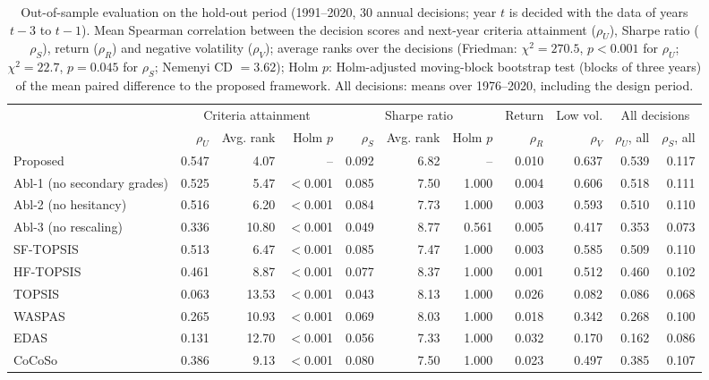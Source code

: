 \begin{table}[!htbp]
\centering
\scriptsize
\caption{Out-of-sample evaluation on the hold-out period (1991--2020, 30 annual decisions; year $t$ is decided with the data of years $t-3$ to $t-1$). Mean Spearman correlation between the decision scores and next-year criteria attainment ($\rho_U$), Sharpe ratio ($\rho_S$), return ($\rho_R$) and negative volatility ($\rho_V$); average ranks over the decisions (Friedman: $\chi^2=270.5$, $p<0.001$ for $\rho_U$; $\chi^2=22.7$, $p=0.045$ for $\rho_S$; Nemenyi CD $=3.62$); Holm $p$: Holm-adjusted moving-block bootstrap test (blocks of three years) of the mean paired difference to the proposed framework. All decisions: means over 1976--2020, including the design period.}\label{tab:oos}
\begin{adjustbox}{max width=\textwidth}
\begin{tabular}{lrrrrrrrrrr}
\toprule
 & \multicolumn{3}{c}{Criteria attainment} & \multicolumn{3}{c}{Sharpe ratio} & Return & Low vol. & \multicolumn{2}{c}{All decisions}\\
\cmidrule(lr){2-4}\cmidrule(lr){5-7}\cmidrule(lr){10-11}
 & $\rho_U$ & Avg. rank & Holm $p$ & $\rho_S$ & Avg. rank  & Holm $p$  & $\rho_R$ & $\rho_V$ & $\rho_U$, all & $\rho_S$, all \\
\midrule
Proposed & 0.547 & 4.07 & -- & 0.092 & 6.82 & -- & 0.010 & 0.637 & 0.539 & 0.117 \\
Abl-1 (no secondary grades) & 0.525 & 5.47 & $<$0.001 & 0.085 & 7.50 & 1.000 & 0.004 & 0.606 & 0.518 & 0.111 \\
Abl-2 (no hesitancy) & 0.516 & 6.20 & $<$0.001 & 0.084 & 7.73 & 1.000 & 0.003 & 0.593 & 0.510 & 0.110 \\
Abl-3 (no rescaling) & 0.336 & 10.80 & $<$0.001 & 0.049 & 8.77 & 0.561 & 0.005 & 0.417 & 0.353 & 0.073 \\
SF-TOPSIS & 0.513 & 6.47 & $<$0.001 & 0.085 & 7.47 & 1.000 & 0.003 & 0.585 & 0.509 & 0.110 \\
HF-TOPSIS & 0.461 & 8.87 & $<$0.001 & 0.077 & 8.37 & 1.000 & 0.001 & 0.512 & 0.460 & 0.102 \\
TOPSIS & 0.063 & 13.53 & $<$0.001 & 0.043 & 8.13 & 1.000 & 0.026 & 0.082 & 0.086 & 0.068 \\
WASPAS & 0.265 & 10.93 & $<$0.001 & 0.069 & 8.03 & 1.000 & 0.018 & 0.342 & 0.268 & 0.100 \\
EDAS & 0.131 & 12.70 & $<$0.001 & 0.056 & 7.33 & 1.000 & 0.032 & 0.170 & 0.162 & 0.086 \\
CoCoSo & 0.386 & 9.13 & $<$0.001 & 0.080 & 7.50 & 1.000 & 0.023 & 0.497 & 0.385 & 0.107 \\

\end{tabular}
\end{adjustbox}
\end{table}
